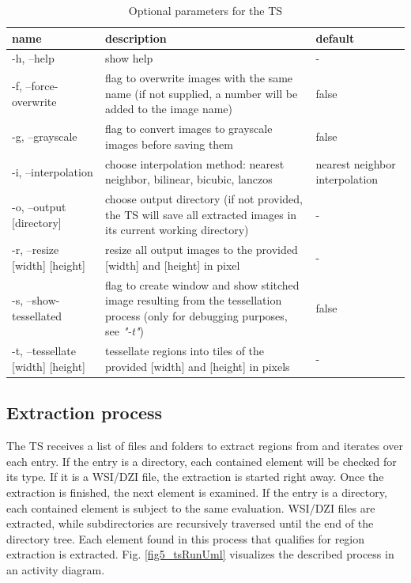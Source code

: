 \begin{table}[H]
	\begin{center}
		\begin{tabular}{| p{3cm} | p{5cm} | p{3cm} |}
			\hline
			\textbf{name} & \textbf{description} & \textbf{default}\\ \hline
			-h, --help & show help & - \\ \hline
			-f, --force-overwrite & flag to overwrite images with the same name (if not supplied, a number will be added to the image name) & false \\ \hline
			-g, --grayscale & flag to convert images to grayscale images before saving them & false \\ \hline
			-i, --interpolation & choose interpolation method: nearest neighbor, bilinear, bicubic, lanczos  & nearest neighbor interpolation \\ \hline
			-o, --output [directory] & choose output directory (if not provided, the TS will save all extracted images in its current working directory) & - \\ \hline
			-r, --resize [width] [height] & resize all output images to the provided [width] and [height] in pixel & - \\ \hline
			-s, --show-tessellated & flag to create window and show stitched image resulting from the tessellation process (only for debugging purposes, see \emph{"-t"}) & false\\ \hline
			-t, --tessellate [width] [height] & tessellate regions into tiles of the provided [width] and [height] in pixels & - \\ \hline
		\end{tabular}
		\caption{Optional parameters for the TS}
		\label{tab5_tsParams}
	\end{center}
\end{table}


\subsection{Extraction process}
\label{sec5_extractionProcess}
The TS receives a list of files and folders to extract regions from and iterates over each entry. If the entry is a directory, each contained element will be checked for its type. If it is a WSI/DZI file, the extraction is started right away. Once the extraction is finished, the next element is examined. If the entry is a directory, each contained element is subject to the same evaluation. WSI/DZI files are extracted, while subdirectories are recursively traversed until the end of the directory tree. Each element found in this process that qualifies for region extraction is extracted. Fig. \ref{fig5_tsRunUml} visualizes the described process in an activity diagram.

